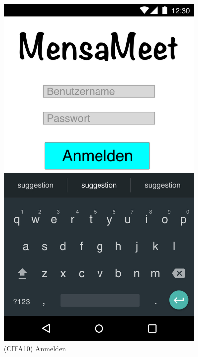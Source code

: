 \documentclass[a4paper]{scrreprt}
\begin{document}
\begin{figure}[H]
\begin{minipage}[b]{0.48\textwidth}
		\includegraphics[width=0.9\textwidth]{res/GUI/02.jpeg}
		\label{Fig.2}
		(\hyperlink{cifa10}{CIFA10}) Anmelden
	\end{minipage}
\end{figure}
\end{document}
